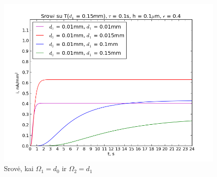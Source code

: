 \documentclass[12pt, a4paper, lithuanian]{article}
\begin{document}
 \begin{figure}[H]
     \centering
     \includegraphics[scale=0.5]{img/kurI}
     \caption{Srovė, kai $\Omega_1 = d_0$ ir $\Omega_2 = d_1$}
     \label{img:mlp}
 \end{figure}
 
\appendix
 
% 
% 
% 




%
\end{document}
